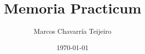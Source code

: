 \documentclass[a4paper,11pt,twoside,openright]{book}
\title{Memoria Practicum}
\author{Marcos Chavarría Teijeiro}
\date{\today}
\begin{document}
    \renewcommand{\lstlistingname}{Fragmento de Código}
    \renewcommand{\lstlistlistingname}{Fragmentos de Código}
    \renewcommand{\listtablename}{Índice de táboas}
    \renewcommand{\tablename}{Táboa}
    \renewcommand{\contentsname}{Índice xeral}

        

        \frontmatter

        \thispagestyle{empty}     %

        
        \thispagestyle{empty}     %

        \tableofcontents
        \listoffigures


        \mainmatter
        
        
        
        

        \appendix

        \nocite{*}  %
        
        

       

        
\end{document}
